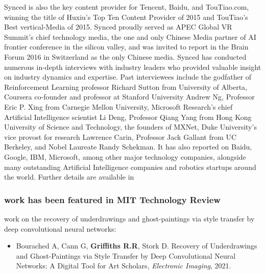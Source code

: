\documentclass[11pt]{article}
\begin{document}
Synced is also the key content provider for Tencent, Baidu, and TouTiao.com, winning the title of Huxiu’s Top Ten Content Provider of 2015 and TouTiao’s Best vertical-Media of 2015. Synced proudly served as APEC Global VR Summit’s chief technology media, the one and only Chinese Media partner of AI frontier conference in the silicon valley, and was invited to report in the Brain Forum 2016 in Switzerland as the only Chinese media. Synced has conducted numerous in-depth interviews with industry leaders who provided valuable insight on industry dynamics and expertise. Past interviewees include the godfather of Reinforcement Learning professor Richard Sutton from University of Alberta, Coursera co-founder and professor at Stanford University Andrew Ng, Professor Eric P. Xing from Carnegie Mellon University, Microsoft Research’s chief Artificial Intelligence scientist Li Deng, Professor Qiang Yang from Hong Kong University of Science and Technology, the founders of MXNet, Duke University’s vice provost for research Lawrence Carin, Professor Jack Gallant from UC Berkeley, and Nobel Laureate Randy Schekman. It has also reported on Baidu, Google, IBM, Microsoft, among other major technology companies, alongside many outstanding Artificial Intelligence companies and robotics startups around the world. Further details are available in \cite{media}

\subsubsection{\drs work has been featured in MIT Technology Review}
\label{mit_review}

\drs work on the recovery of underdrawings and ghost-paintings via style transfer by deep convolutional neural networks:

\begin{itemize}
\item Bourached A, Cann G, \textbf{Griffiths R.R}, Stork D. Recovery of Underdrawings and Ghost-Paintings via Style Transfer by Deep Convolutional Neural Networks: A Digital Tool for Art Scholars, \textit{Electronic Imaging}, 2021.
\end{itemize}
\end{document}
